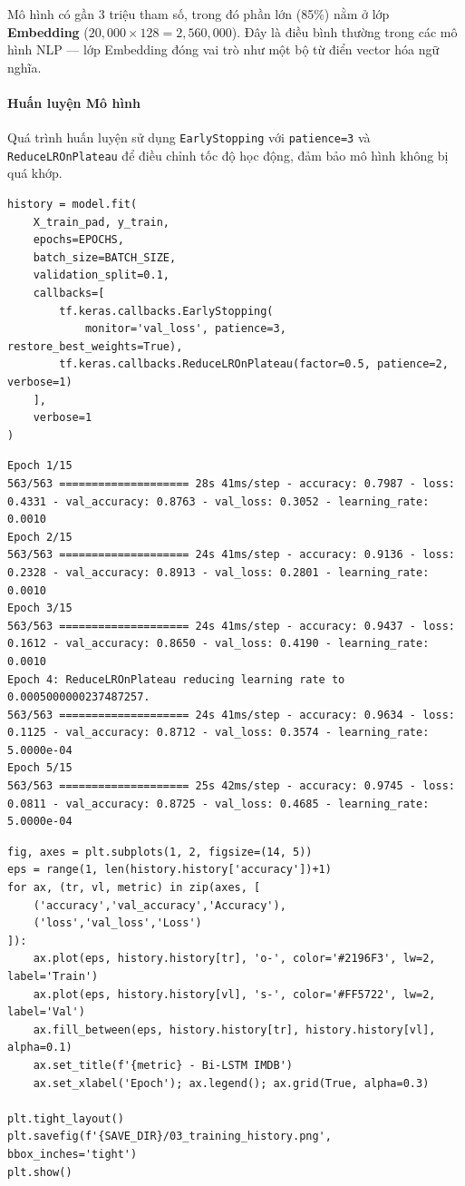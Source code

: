 Mô hình có gần $3$ triệu tham số, trong đó phần lớn (85\%) nằm ở lớp \textbf{Embedding} ($20{,}000 \times 128 = 2{,}560{,}000$). Đây là điều bình thường trong các mô hình NLP --- lớp Embedding đóng vai trò như một bộ từ điển vector hóa ngữ nghĩa.

\paragraph{Huấn luyện Mô hình} \hfill\mbox{}

Quá trình huấn luyện sử dụng \texttt{EarlyStopping} với \texttt{patience=3} và \texttt{ReduceLROnPlateau} để điều chỉnh tốc độ học động, đảm bảo mô hình không bị quá khớp.

\begin{lstlisting}[style=pythoncode, caption={Huấn luyện BiLSTM với EarlyStopping}]
history = model.fit(
    X_train_pad, y_train,
    epochs=EPOCHS,
    batch_size=BATCH_SIZE,
    validation_split=0.1,
    callbacks=[
        tf.keras.callbacks.EarlyStopping(
            monitor='val_loss', patience=3, restore_best_weights=True),
        tf.keras.callbacks.ReduceLROnPlateau(factor=0.5, patience=2, verbose=1)
    ],
    verbose=1
)
\end{lstlisting}

\begin{lstlisting}[style=consoleoutput, caption={Output: Training Log (trích)}]
Epoch 1/15
563/563 ==================== 28s 41ms/step - accuracy: 0.7987 - loss: 0.4331 - val_accuracy: 0.8763 - val_loss: 0.3052 - learning_rate: 0.0010
Epoch 2/15
563/563 ==================== 24s 41ms/step - accuracy: 0.9136 - loss: 0.2328 - val_accuracy: 0.8913 - val_loss: 0.2801 - learning_rate: 0.0010
Epoch 3/15
563/563 ==================== 24s 41ms/step - accuracy: 0.9437 - loss: 0.1612 - val_accuracy: 0.8650 - val_loss: 0.4190 - learning_rate: 0.0010
Epoch 4: ReduceLROnPlateau reducing learning rate to 0.0005000000237487257.
563/563 ==================== 24s 41ms/step - accuracy: 0.9634 - loss: 0.1125 - val_accuracy: 0.8712 - val_loss: 0.3574 - learning_rate: 5.0000e-04
Epoch 5/15
563/563 ==================== 25s 42ms/step - accuracy: 0.9745 - loss: 0.0811 - val_accuracy: 0.8725 - val_loss: 0.4685 - learning_rate: 5.0000e-04
\end{lstlisting}

\begin{lstlisting}[style=pythoncode, caption={Vẽ đồ thị Accuracy và Loss}]
fig, axes = plt.subplots(1, 2, figsize=(14, 5))
eps = range(1, len(history.history['accuracy'])+1)
for ax, (tr, vl, metric) in zip(axes, [
    ('accuracy','val_accuracy','Accuracy'),
    ('loss','val_loss','Loss')
]):
    ax.plot(eps, history.history[tr], 'o-', color='#2196F3', lw=2, label='Train')
    ax.plot(eps, history.history[vl], 's-', color='#FF5722', lw=2, label='Val')
    ax.fill_between(eps, history.history[tr], history.history[vl], alpha=0.1)
    ax.set_title(f'{metric} - Bi-LSTM IMDB')
    ax.set_xlabel('Epoch'); ax.legend(); ax.grid(True, alpha=0.3)

plt.tight_layout()
plt.savefig(f'{SAVE_DIR}/03_training_history.png', bbox_inches='tight')
plt.show()
\end{lstlisting}

